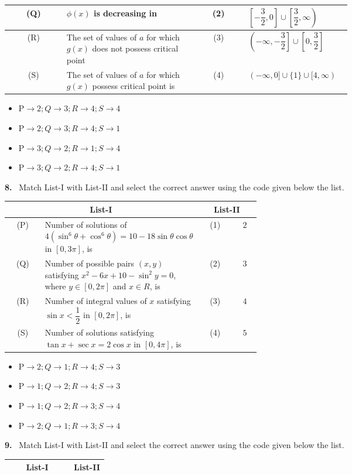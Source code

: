 \documentclass[10pt]{extarticle}
\newcommand{\qn}[1]{\par\smallskip\noindent\textbf{#1.}~}
\newenvironment{qoptions}{\begin{itemize}[leftmargin=1.8em,itemsep=1pt,topsep=2pt,label={}]}{\end{itemize}}
\newcommand{\opt}[2]{\item[(#1)] #2}
\begin{document}
\begin{multicols}{2}
\begin{center}
{\begin{tabular}{|c|p{0.38\linewidth}|c|p{0.3\linewidth}|}
(Q) & $\phi(x)$ is decreasing in & (2) & $\left[-\dfrac32,0\right]\cup\left[\dfrac32,\infty\right)$\\\hline
(R) & The set of values of $a$ for which $g(x)$ does not possess critical point & (3) & $\left(-\infty,-\dfrac32\right]\cup\left[0,\dfrac32\right]$\\\hline
(S) & The set of values of $a$ for which $g(x)$ possess critical point is & (4) & $(-\infty,0]\cup\{1\}\cup[4,\infty)$\\\hline
\end{tabular}}
\end{center}
\begin{qoptions}
\opt{A}{$\mathrm P\to2;Q\to3;R\to4;S\to4$}
\opt{B}{$\mathrm P\to2;Q\to3;R\to4;S\to1$}
\opt{C}{$\mathrm P\to3;Q\to2;R\to1;S\to4$}
\opt{D}{$\mathrm P\to3;Q\to2;R\to4;S\to1$}
\end{qoptions}
\qn{8} Match List-I with List-II and select the correct answer using the code given below the list.
\begin{center}
{\footnotesize\setlength{\tabcolsep}{2pt}\begin{tabular}{|c|p{0.5\linewidth}|c|c|}\hline
\multicolumn{2}{|c|}{List-I} & \multicolumn{2}{c|}{List-II}\\\hline
(P) & Number of solutions of $4(\sin^6\theta+\cos^6\theta)=10-18\sin\theta\cos\theta$ in $[0,3\pi]$, is & (1) & $2$\\\hline
(Q) & Number of possible pairs $(x,y)$ satisfying $x^2-6x+10-\sin^2y=0$, where $y\in[0,2\pi]$ and $x\in R$, is & (2) & $3$\\\hline
(R) & Number of integral values of $x$ satisfying $\sin x<\dfrac12$ in $[0,2\pi]$, is & (3) & $4$\\\hline
(S) & Number of solutions satisfying $\tan x+\sec x=2\cos x$ in $[0,4\pi]$, is & (4) & $5$\\\hline
\end{tabular}}
\end{center}
\begin{qoptions}
\opt{A}{$\mathrm P\to2;Q\to1;R\to4;S\to3$}
\opt{B}{$\mathrm P\to1;Q\to2;R\to4;S\to3$}
\opt{C}{$\mathrm P\to1;Q\to2;R\to3;S\to4$}
\opt{D}{$\mathrm P\to2;Q\to1;R\to3;S\to4$}
\end{qoptions}
\qn{9} Match List-I with List-II and select the correct answer using the code given below the list.
\begin{center}
{\footnotesize\setlength{\tabcolsep}{2pt}\begin{tabular}{|c|p{0.5\linewidth}|c|c|}\hline
\multicolumn{2}{|c|}{List-I} & \multicolumn{2}{c|}{List-II}\\\hline

\end{tabular}}
\end{center}
\end{multicols}
\end{document}

